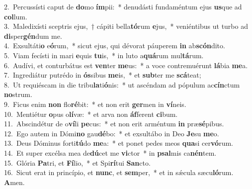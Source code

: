 {2.~}Percussísti caput de \textbf{do}mo \textbf{ím}pii:~* denudásti fundaméntum ejus \textbf{us}que ad \textbf{col}lum.\\
{3.~}Maledixísti sceptris ejus,~† cápiti bella\textbf{tó}rum \textbf{e}jus,~* veniéntibus ut turbo ad \textbf{di}sper\textbf{gén}dum me.\\
{4.~}Exsultáti\textbf{o} e\textbf{ó}rum,~* sicut ejus, qui dévorat páuperem \textbf{in} ab\textbf{scón}dito.\\
{5.~}Viam fecísti in mari \textbf{e}quis \textbf{tu}is,~* in luto a\textbf{quá}rum mul\textbf{tá}rum.\\
{6.~}Audívi, et conturbátus est \textbf{ven}ter \textbf{me}us:~* a voce contremuérunt \textbf{lá}bia \textbf{me}a.\\
{7.~}Ingrediátur putrédo in \textbf{ós}sibus \textbf{me}is,~* et \textbf{sub}ter me \textbf{scá}teat;\\
{8.~}Ut requiéscam in die tribu\textbf{la}ti\textbf{ó}nis:~* ut ascéndam ad pópulum ac\textbf{cín}ctum \textbf{no}strum.\\
{9.~}Ficus enim \textbf{non} flo\textbf{ré}bit:~* et non erit \textbf{ger}men in \textbf{ví}neis.\\
{10.~}Mentiétur \textbf{o}pus o\textbf{lí}væ:~* et arva non \textbf{áf}ferent \textbf{ci}bum.\\
{11.~}Abscindétur de o\textbf{ví}li \textbf{pe}cus:~* et non erit arméntum \textbf{in} præ\textbf{sé}pibus.\\
{12.~}Ego autem in Dómi\textbf{no} gau\textbf{dé}bo:~* et exsultábo in Deo \textbf{Je}su \textbf{me}o.\\
{13.~}Deus Dóminus forti\textbf{tú}do \textbf{me}a:~* et ponet pedes meos \textbf{qua}si cer\textbf{vó}rum.\\
{14.~}Et super excélsa mea de\textbf{dú}cet me \textbf{vi}ctor~* in \textbf{psal}mis ca\textbf{nén}tem.\\
{15.~}Glória \textbf{Pa}tri, et \textbf{Fí}lio,~* et Spi\textbf{rí}tui \textbf{San}cto.\\
{16.~}Sicut erat in princípio, et \textbf{nunc}, et \textbf{sem}per,~* et in sǽcula sæcu\textbf{ló}rum. \textbf{A}men.\\
